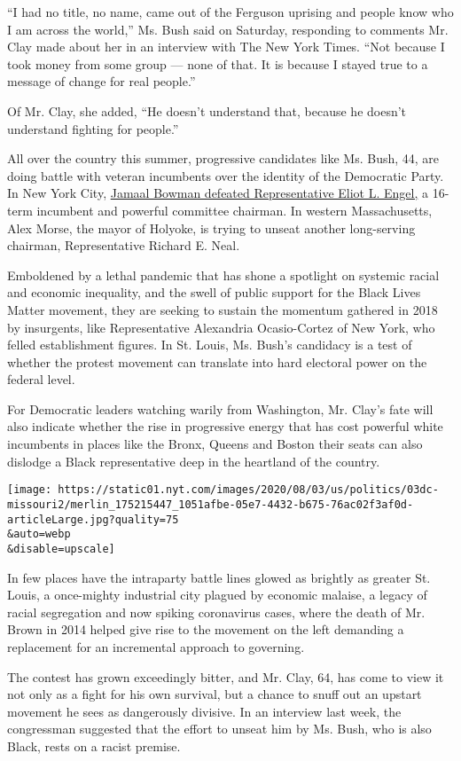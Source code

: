 ``I had no title, no name, came out of the Ferguson uprising and people
know who I am across the world,'' Ms. Bush said on Saturday, responding
to comments Mr. Clay made about her in an interview with The New York
Times. ``Not because I took money from some group --- none of that. It
is because I stayed true to a message of change for real people.''

Of Mr. Clay, she added, ``He doesn't understand that, because he doesn't
understand fighting for people.''

All over the country this summer, progressive candidates like Ms. Bush,
44, are doing battle with veteran incumbents over the identity of the
Democratic Party. In New York City,
\href{https://www.nytimes.com/2020/07/17/nyregion/jamaal-bowman-eliot-engel.html}{Jamaal
Bowman defeated Representative Eliot L. Engel,} a 16-term incumbent and
powerful committee chairman. In western Massachusetts, Alex Morse, the
mayor of Holyoke, is trying to unseat another long-serving chairman,
Representative Richard E. Neal.

Emboldened by a lethal pandemic that has shone a spotlight on systemic
racial and economic inequality, and the swell of public support for the
Black Lives Matter movement, they are seeking to sustain the momentum
gathered in 2018 by insurgents, like Representative Alexandria
Ocasio-Cortez of New York, who felled establishment figures. In St.
Louis, Ms. Bush's candidacy is a test of whether the protest movement
can translate into hard electoral power on the federal level.

For Democratic leaders watching warily from Washington, Mr. Clay's fate
will also indicate whether the rise in progressive energy that has cost
powerful white incumbents in places like the Bronx, Queens and Boston
their seats can also dislodge a Black representative deep in the
heartland of the country.

\texttt{[image: https://static01.nyt.com/images/2020/08/03/us/politics/03dc-missouri2/merlin\_175215447\_1051afbe-05e7-4432-b675-76ac02f3af0d-articleLarge.jpg?quality=75\\\&auto=webp\\\&disable=upscale]}

In few places have the intraparty battle lines glowed as brightly as
greater St. Louis, a once-mighty industrial city plagued by economic
malaise, a legacy of racial segregation and now spiking coronavirus
cases, where the death of Mr. Brown in 2014 helped give rise to the
movement on the left demanding a replacement for an incremental approach
to governing.

The contest has grown exceedingly bitter, and Mr. Clay, 64, has come to
view it not only as a fight for his own survival, but a chance to snuff
out an upstart movement he sees as dangerously divisive. In an interview
last week, the congressman suggested that the effort to unseat him by
Ms. Bush, who is also Black, rests on a racist premise.

